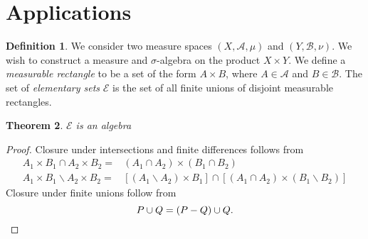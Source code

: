 \documentclass[prb,12pt]{revtex4-2}
\newtheorem{Theorem}{Theorem}
\theoremstyle{definition}
\theoremstyle{definition}
\newtheorem{Definition}[Theorem]{Definition}
\begin{document}
\section{Applications}
\begin{Definition}
	We consider two measure spaces $(X,\mathcal{A},\mu)$ and $(Y,\mathcal{B},\nu)$. We wish to construct a measure and $\sigma$-algebra on the product $X\times Y$. We define a \emph{measurable rectangle} to be a set of the form $A\times B$, where $A\in \mathcal{A}$ and $B\in \mathcal{B}$. The set of \emph{elementary sets} $\mathcal{E}$ is the set of all finite unions of disjoint measurable rectangles.
\end{Definition}
\begin{Theorem}
$\mathcal{E}$ is an algebra	
\end{Theorem}
\begin{proof}
	Closure under intersections and finite differences follows from
	\begin{align*}
		A_1\times B_1\cap A_2\times B_2=&(A_1\cap A_2)\times (B_1\cap B_2)\\
		A_1\times B_1\backslash A_2\times B_2=&[(A_1\backslash A_2)\times B_1]\cap [(A_1\cap A_2)\times (B_1\backslash B_2)]
	\end{align*}
	Closure under finite unions follow from
	\[
	P\cup Q = (P-Q)\cup Q
	.\qedhere\] 
\end{proof}
\end{document}
